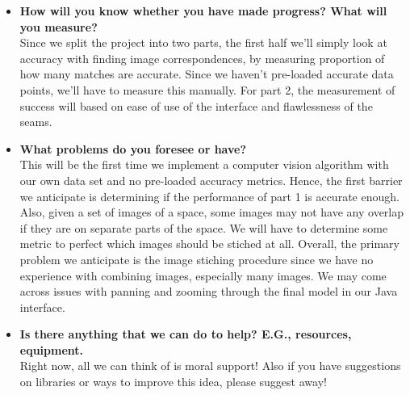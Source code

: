 \begin{itemize}
  \item \textbf{How will you know whether you have made progress? What will you measure?} \\
  Since we split the project into two parts, the first half we'll simply look at accuracy with finding image correspondences, by measuring proportion of how many matches are accurate. Since we haven't pre-loaded accurate data points, we'll have to measure this manually.
  For part 2, the measurement of success will based on ease of use of the interface and flawlessness of the seams.

  \item \textbf{What problems do you foresee or have?} \\
  This will be the first time we implement a computer vision algorithm with our own data set and no pre-loaded accuracy metrics. Hence, the first barrier we anticipate is determining if the performance of part 1 is accurate enough. Also, given a set of images of a space, some images may not have any overlap if they are on separate parts of the space. We will have to determine some metric to perfect which images should be stiched at all. Overall, the primary problem we anticipate is the image stiching procedure since we have no experience with combining images, especially many images. We may come across issues with panning and zooming through the final model in our Java interface.

  \item \textbf{Is there anything that we can do to help? E.G., resources, equipment.} \\
  Right now, all we can think of is moral support! Also if you have suggestions on libraries or ways to improve this idea, please suggest away!

\end{itemize}


